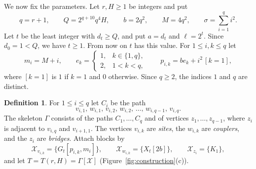 \documentclass[11pt]{amsart}
\theoremstyle{definition}
\newtheorem{definition}[theorem]{Definition}
\theoremstyle{remark}
\numberwithin{equation}{section}
\newcommand{\cX}{\mathcal{X}}
\begin{document}
We now fix the parameters. Let $r,H\ge1$ be integers and put
\[
q=r+1,\qquad Q=2^{q+10}q^4H,\qquad b=2q^2,\qquad M=4q^2,\qquad\sigma=\sum_{i=1}^qi^2.
\]
Let $t$ be the least integer with $d_t\ge Q$, and put $a=d_t$ and $\ell=2^t$. Since $d_0=1<Q$, we have $t\ge1$. From now on $t$ has this value. For $1\le i,k\le q$ let
\[
m_i=M+i,\qquad e_k=\begin{cases}1,&k\in\{1,q\},\\2,&1<k<q,\end{cases}\qquad p_{i,k}=be_k+i^2\,[k=1],
\]
where $[k=1]$ is $1$ if $k=1$ and $0$ otherwise. Since $q\ge2$, the indices $1$ and $q$ are distinct.

\begin{definition}\label{def:T}
For $1\le i\le q$ let $C_i$ be the path
\[
v_{i,1},\,w_{i,1},\,v_{i,2},\,w_{i,2},\,\dots,\,w_{i,q-1},\,v_{i,q}.
\]
The skeleton $\Gamma$ consists of the paths $C_1,\dots,C_q$ and of vertices $z_1,\dots,z_{q-1}$, where $z_i$ is adjacent to $v_{i,q}$ and $v_{i+1,1}$. The vertices $v_{i,k}$ are \emph{sites}, the $w_{i,k}$ are \emph{couplers}, and the $z_i$ are \emph{bridges}. Attach blocks by
\[
\cX_{v_{i,k}}=\{G_t[p_{i,k},m_i]\},\qquad\cX_{w_{i,k}}=\{X_t[2b]\},\qquad\cX_{z_i}=\{K_1\},
\]
and let $T=T(r,H)=\Gamma[\cX]$ (Figure~\ref{fig:construction}(c)).
\end{definition}
\end{document}
